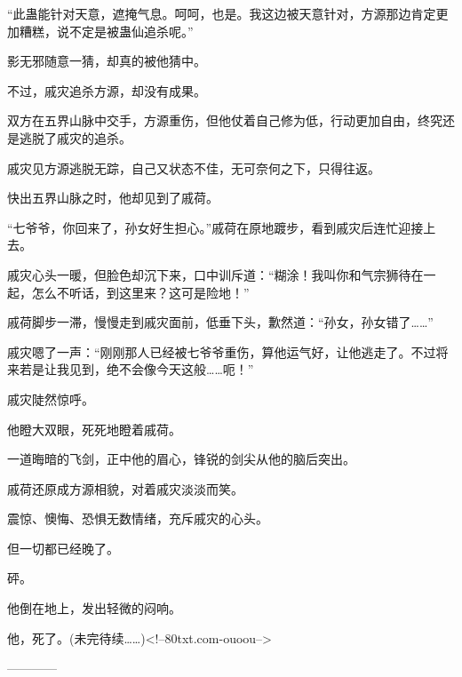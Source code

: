 \begin{this_body}
“此蛊能针对天意，遮掩气息。呵呵，也是。我这边被天意针对，方源那边肯定更加糟糕，说不定是被蛊仙追杀呢。”

影无邪随意一猜，却真的被他猜中。

不过，戚灾追杀方源，却没有成果。

双方在五界山脉中交手，方源重伤，但他仗着自己修为低，行动更加自由，终究还是逃脱了戚灾的追杀。

戚灾见方源逃脱无踪，自己又状态不佳，无可奈何之下，只得往返。

快出五界山脉之时，他却见到了戚荷。

“七爷爷，你回来了，孙女好生担心。”戚荷在原地踱步，看到戚灾后连忙迎接上去。

戚灾心头一暖，但脸色却沉下来，口中训斥道：“糊涂！我叫你和气宗狮待在一起，怎么不听话，到这里来？这可是险地！”

戚荷脚步一滞，慢慢走到戚灾面前，低垂下头，歉然道：“孙女，孙女错了……”

戚灾嗯了一声：“刚刚那人已经被七爷爷重伤，算他运气好，让他逃走了。不过将来若是让我见到，绝不会像今天这般……呃！”

戚灾陡然惊呼。

他瞪大双眼，死死地瞪着戚荷。

一道晦暗的飞剑，正中他的眉心，锋锐的剑尖从他的脑后突出。

戚荷还原成方源相貌，对着戚灾淡淡而笑。

震惊、懊悔、恐惧无数情绪，充斥戚灾的心头。

但一切都已经晚了。

砰。

他倒在地上，发出轻微的闷响。

他，死了。(未完待续……)<!--80txt.com-ouoou-->

------------

\end{this_body}

